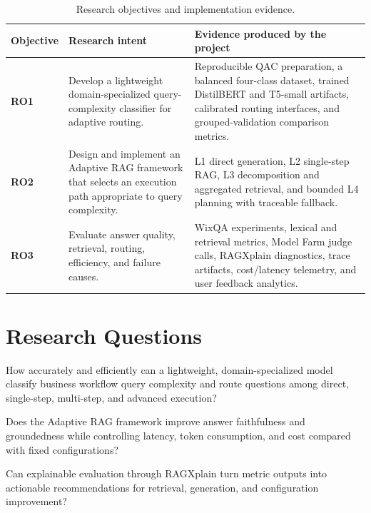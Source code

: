 \begin{table}[H]
  \centering
  \caption{Research objectives and implementation evidence.}
  \label{tab:research-objectives}
  \begin{tabularx}{\textwidth}{>{\bfseries}p{}X X}
    \toprule
    Objective & Research intent & Evidence produced by the project\\
    \midrule
    RO1 &
    Develop a lightweight domain-specialized query-complexity classifier for
    adaptive routing. &
    Reproducible QAC preparation, a balanced four-class dataset, trained
    DistilBERT and T5-small artifacts, calibrated routing interfaces, and
    grouped-validation comparison metrics.\\
    RO2 &
    Design and implement an Adaptive RAG framework that selects an execution
    path appropriate to query complexity. &
    L1 direct generation, L2 single-step RAG, L3 decomposition and aggregated
    retrieval, and bounded L4 planning with traceable fallback.\\
    RO3 &
    Evaluate answer quality, retrieval, routing, efficiency, and failure
    causes. &
    WixQA experiments, lexical and retrieval metrics, Model Farm judge calls,
    RAGXplain diagnostics, trace artifacts, cost/latency telemetry, and user
    feedback analytics.\\
    \bottomrule
  \end{tabularx}
\end{table}

\section{Research Questions}

\begin{description}[style=nextline,leftmargin=1.5cm]
  \item[RQ1]
  How accurately and efficiently can a lightweight, domain-specialized model
  classify business workflow query complexity and route questions among direct,
  single-step, multi-step, and advanced execution?

  \item[RQ2]
  Does the Adaptive RAG framework improve answer faithfulness and groundedness
  while controlling latency, token consumption, and cost compared with fixed
  configurations?

  \item[RQ3]
  Can explainable evaluation through RAGXplain turn metric outputs into
  actionable recommendations for retrieval, generation, and configuration
  improvement?
\end{description}

